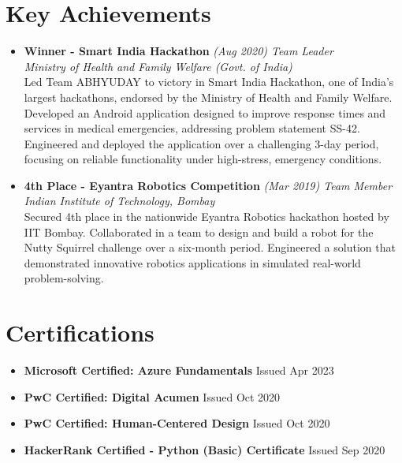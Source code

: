 \documentclass[a4paper,12pt]{article}
\begin{document}
\section{Key Achievements}
\begin{itemize}[noitemsep,topsep=0pt,leftmargin=*]
    \item \textbf{Winner - Smart India Hackathon} \textit{(Aug 2020) Team Leader} \\
    \textit{Ministry of Health and Family Welfare (Govt. of India)} \\
    Led Team ABHYUDAY to victory in Smart India Hackathon, one of India's largest hackathons, endorsed by the Ministry of Health and Family Welfare. Developed an Android application designed to improve response times and services in medical emergencies, addressing problem statement SS-42. Engineered and deployed the application over a challenging 3-day period, focusing on reliable functionality under high-stress, emergency conditions.
    \item \textbf{4th Place - Eyantra Robotics Competition} \textit{(Mar 2019) Team Member} \\
    \textit{Indian Institute of Technology, Bombay} \\
    Secured 4th place in the nationwide Eyantra Robotics hackathon hosted by IIT Bombay. Collaborated in a team to design and build a robot for the Nutty Squirrel challenge over a six-month period. Engineered a solution that demonstrated innovative robotics applications in simulated real-world problem-solving.
\end{itemize}

\section{Certifications}
\begin{itemize}[noitemsep,topsep=0pt,parsep=0pt,itemsep=-3pt,leftmargin=*]
    \item \textbf{Microsoft Certified: Azure Fundamentals} \hfill Issued Apr 2023 \\
    \item \textbf{PwC Certified: Digital Acumen} \hfill Issued Oct 2020 \\
    \item \textbf{PwC Certified: Human-Centered Design} \hfill Issued Oct 2020 \\
    \item \textbf{HackerRank Certified - Python (Basic) Certificate} \hfill Issued Sep 2020 \\
\end{itemize}



\vfill
{}
\end{document}
